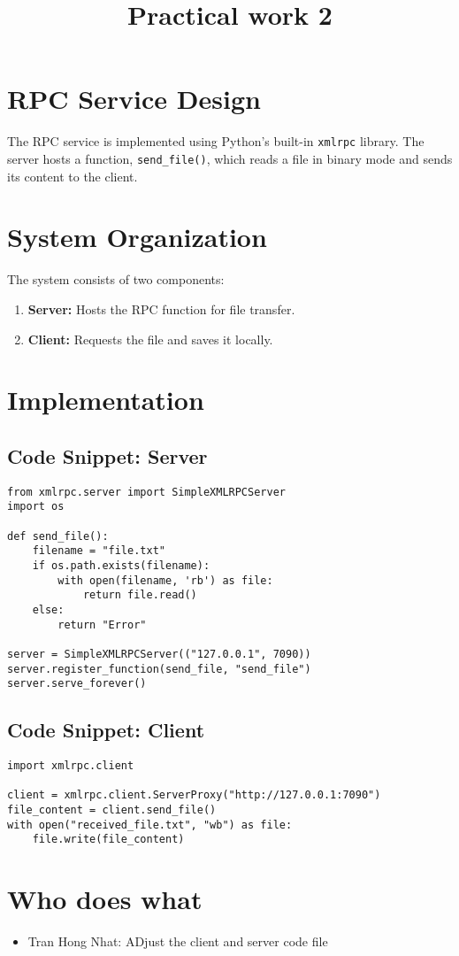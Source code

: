 \documentclass[12pt]{article}
\title{Practical work 2}
\begin{document}
\maketitle

\section*{RPC Service Design}
The RPC service is implemented using Python's built-in \texttt{xmlrpc} library. The server hosts a function, \texttt{send\_file()}, which reads a file in binary mode and sends its content to the client.


\section*{System Organization}
The system consists of two components:
\begin{enumerate}
    \item \textbf{Server:} Hosts the RPC function for file transfer.
    \item \textbf{Client:} Requests the file and saves it locally.
\end{enumerate}


\section*{Implementation}
\subsection*{Code Snippet: Server}
\begin{verbatim}
from xmlrpc.server import SimpleXMLRPCServer
import os

def send_file():
    filename = "file.txt"
    if os.path.exists(filename):
        with open(filename, 'rb') as file:
            return file.read()
    else:
        return "Error"

server = SimpleXMLRPCServer(("127.0.0.1", 7090))
server.register_function(send_file, "send_file")
server.serve_forever()
\end{verbatim}

\subsection*{Code Snippet: Client}
\begin{verbatim}
import xmlrpc.client

client = xmlrpc.client.ServerProxy("http://127.0.0.1:7090")
file_content = client.send_file()
with open("received_file.txt", "wb") as file:
    file.write(file_content)
\end{verbatim}

\section*{Who does what}
\begin{itemize}
    \item Tran Hong Nhat: ADjust the client and server code file
\end{itemize}
\end{document}
